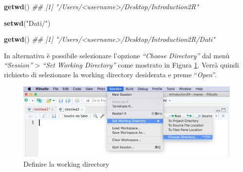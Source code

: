 \documentclass[
]{book}
\newenvironment{Shaded}{\begin{snugshade}}{\end{snugshade}}
\newcommand{\CommentTok}[1]{\textcolor[rgb]{0.56,0.35,0.01}{\textit{#1}}}
\newcommand{\KeywordTok}[1]{\textcolor[rgb]{0.13,0.29,0.53}{\textbf{#1}}}
\newcommand{\NormalTok}[1]{#1}
\newcommand{\StringTok}[1]{\textcolor[rgb]{0.31,0.60,0.02}{#1}}
\begin{document}
\begin{Shaded}
\begin{Highlighting}[]
\KeywordTok{getwd}\NormalTok{()}
\CommentTok{## [1] "/Users/<username>/Desktop/Introduction2R"}

\KeywordTok{setwd}\NormalTok{(}\StringTok{"Dati/"}\NormalTok{)}

\KeywordTok{getwd}\NormalTok{()}
\CommentTok{## [1] "/Users/<username>/Desktop/Introduction2R/Dati"}
\end{Highlighting}
\end{Shaded}

In alternativa è possibile selezionare l'opzione \emph{``Choose Directory''} dal menù \emph{``Session''} \textgreater{} \emph{``Set Working Directory''} come mostrato in Figura \ref{fig:set-wd}. Verrà quindi richiesto di selezionare la working directory desiderata e preme ``\emph{Open}''.

\begin{figure}

{\centering \includegraphics[width=0.95\linewidth]{images/set-wd} 

}

\caption{Definire la working directory}\label{fig:set-wd}
\end{figure}
\end{document}
